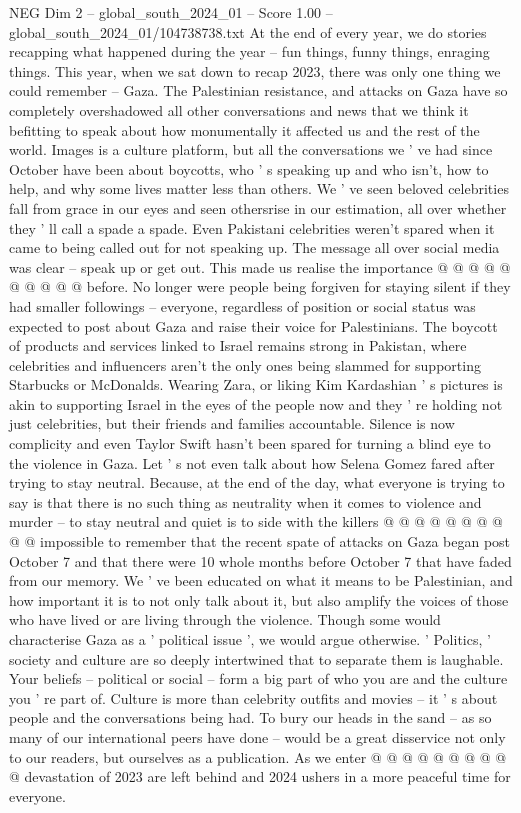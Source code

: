 \begin{textsample}{NEG Dim 2 – global\_south\_2024\_01 – Score 1.00 – global\_south\_2024\_01/104738738.txt}  \label{ex:f2_neg_344}
At the end of every year, we do stories recapping what happened during the year -- fun things, funny things, enraging things.
This year, when we sat down to recap 2023, there was only one thing we could remember -- Gaza.
The Palestinian resistance, and attacks on Gaza have so completely overshadowed all other conversations and news that we think it befitting to speak about how monumentally it affected us and the rest of the world.
Images is a culture platform, but all the conversations we ' ve had since October have been about boycotts, who ' s speaking up and who isn't, how to help, and why some lives matter less than others.
We ' ve seen beloved celebrities fall from grace in our eyes and seen othersrise in our estimation, all over whether they ' ll call a spade a spade.
Even Pakistani celebrities weren't spared when it came to being called out for not speaking up.
The message all over social media was clear -- speak up or get out.
This made us realise the importance @ @ @ @ @ @ @ @ @ @ before.
No longer were people being forgiven for staying silent if they had smaller followings -- everyone, regardless of position or social status was expected to post about Gaza and raise their voice for Palestinians.
The boycott of products and services linked to Israel remains strong in Pakistan, where celebrities and influencers aren't the only ones being slammed for supporting Starbucks or McDonalds.
Wearing Zara, or liking Kim Kardashian ' s pictures is akin to supporting Israel in the eyes of the people now and they ' re holding not just celebrities, but their friends and families accountable.
Silence is now complicity and even Taylor Swift hasn't been spared for turning a blind eye to the violence in Gaza.
Let ' s not even talk about how Selena Gomez fared after trying to stay neutral.
Because, at the end of the day, what everyone is trying to say is that there is no such thing as neutrality when it comes to violence and murder -- to stay neutral and quiet is to side with the killers @ @ @ @ @ @ @ @ @ @ impossible to remember that the recent spate of attacks on Gaza began post October 7 and that there were 10 whole months before October 7 that have faded from our memory.
We ' ve been educated on what it means to be Palestinian, and how important it is to not only talk about it, but also amplify the voices of those who have lived or are living through the violence.
Though some would characterise Gaza as a ' political issue ', we would argue otherwise. ' Politics, ' society and culture are so deeply intertwined that to separate them is laughable.
Your beliefs -- political or social -- form a big part of who you are and the culture you ' re part of.
Culture is more than celebrity outfits and movies -- it ' s about people and the conversations being had.
To bury our heads in the sand -- as so many of our international peers have done -- would be a great disservice not only to our readers, but ourselves as a publication.
As we enter @ @ @ @ @ @ @ @ @ @ devastation of 2023 are left behind and 2024 ushers in a more peaceful time for everyone.

\end{textsample}
